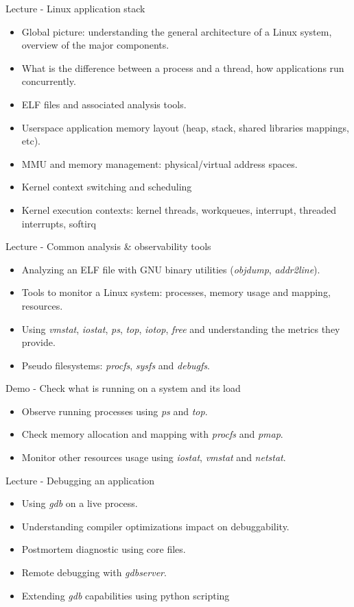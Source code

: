 \documentclass[a4paper,12pt,obeyspaces,spaces,hyphens]{article}
\begin{document}
\feagendaonecolumn
{Lecture - Linux application stack}
{
  \begin{itemize}
  \item Global picture: understanding the general architecture of a
        Linux system, overview of the major components.
  \item What is the difference between a process and a thread, how
    applications run concurrently.
  \item ELF files and associated analysis tools.
  \item Userspace application memory layout (heap, stack, shared
    libraries mappings, etc).
  \item MMU and memory management: physical/virtual address spaces.
  \item Kernel context switching and scheduling
  \item Kernel execution contexts: kernel threads, workqueues,
    interrupt, threaded interrupts, softirq
  \end{itemize}
}

\feagendaonecolumn
{Lecture - Common analysis \& observability tools}
{
  \begin{itemize}
  \item Analyzing an ELF file with GNU binary utilities
    ({\em objdump}, {\em addr2line}).
  \item Tools to monitor a Linux system: processes, memory
    usage and mapping, resources.
  \item Using {\em vmstat}, {\em iostat}, {\em ps}, {\em top}, {\em
      iotop}, {\em free} and understanding the metrics they provide.
  \item Pseudo filesystems: {\em procfs}, {\em sysfs} and {\em
      debugfs}.
  \end{itemize}
}

\feagendaonecolumn
{Demo - Check what is running on a system and its load}
{
  \begin{itemize}
  \item Observe running processes using {\em ps} and {\em top}.
  \item Check memory allocation and mapping with {\em procfs} and {\em
      pmap}.
  \item Monitor other resources usage using {\em iostat}, {\em vmstat}
    and {\em netstat}.
  \end{itemize}
}

\feagendaonecolumn
{Lecture - Debugging an application}
{
  \begin{itemize}
  \item Using {\em gdb} on a live process.
  \item Understanding compiler optimizations impact on debuggability.
  \item Postmortem diagnostic using core files.
  \item Remote debugging with {\em gdbserver}.
  \item Extending {\em gdb} capabilities using python scripting
  \end{itemize}
}
\end{document}
